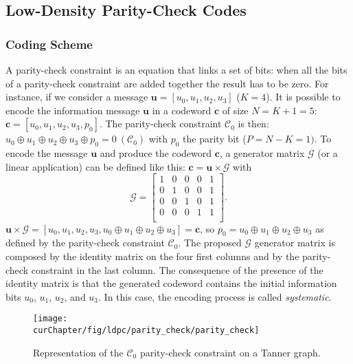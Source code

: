\subsection{Low-Density Parity-Check Codes}
\label{sec:ctx_ldpc}

\subsubsection{Coding Scheme}

A parity-check constraint is an equation that links a set of bits: when all the
bits of a parity-check constraint are added together the result has to be
zero. For instance, if we consider a message $\bm{u} = [u_0, u_1, u_2, u_3]$
($K = 4$). It is possible to encode the information message $\bm{u}$ in a
codeword $\bm{c}$ of size $N = K + 1 = 5$: $\bm{c} = [u_0,u_1,u_2,u_3,p_0]$.
The parity-check constraint $\mathcal{C}_0$ is then: $u_0 \oplus u_1 \oplus u_2
\oplus u_3 \oplus p_0 = 0~(\mathcal{C}_0)$ with $p_0$ the parity bit ($P = N -
K = 1)$. To encode the message $\bm{u}$ and produce the codeword $\bm{c}$, a
generator matrix $\bm{\mathcal{G}}$ (or a linear application) can be defined
like this: $\bm{c} = \bm{u} \times \bm{\mathcal{G}}$ with
\begin{equation*}
\bm{\mathcal{G}} =
\begin{bmatrix}
1 & 0 & 0 & 0 & 1\\
0 & 1 & 0 & 0 & 1\\
0 & 0 & 1 & 0 & 1\\
0 & 0 & 0 & 1 & 1\\
\end{bmatrix}
.
\end{equation*}
$\bm{u} \times \bm{\mathcal{G}} = [u_0,u_1,u_2,u_3,u_0 \oplus u_1 \oplus u_2
\oplus u_3] = \bm{c}$, so $p_0 = u_0 \oplus u_1 \oplus u_2 \oplus u_3$ as
defined by the parity-check constraint $\mathcal{C}_0$. The proposed
$\bm{\mathcal{G}}$ generator matrix is composed by the identity matrix on the
four first columns and by the parity-check constraint in the last column.
The consequence of the presence of the identity matrix is that the generated
codeword contains the initial information bits $u_0$, $u_1$, $u_2$, and $u_3$.
In this case, the encoding process is called \emph{systematic}.

\begin{figure}[htp]
  \centering
  \texttt{[image: \\curChapter/fig/ldpc/parity\_check/parity\_check]}
  \caption{Representation of the $\mathcal{C}_0$ parity-check constraint on a
    Tanner graph.}
  \label{fig:ctx_ldpc_parity_check}
\end{figure}


